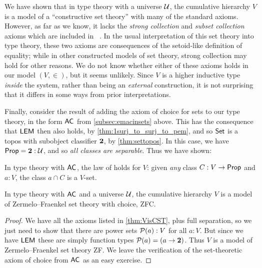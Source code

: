 We have shown that in type theory with a universe $\mathcal{U}$, the cumulative hierarchy $V$ is a model of a ``constructive set theory''
%
with many of the standard axioms.
However, as far as we know, it lacks the \emph{strong collection}
%
%
%
and \emph{subset collection}
%
%
%
axioms which are included in \CZF{}~\cite{AczelCZF}.
In the usual interpretation of this set theory into type theory, these two axioms are consequences of the setoid-like definition of equality; while in other constructed models of set theory, strong collection may hold for other reasons.
We do not know whether either of these axioms holds in our model $(V,\in)$, but it seems unlikely.
Since $V$ is a higher inductive type \emph{inside} the system, rather than being an \emph{external} construction, it is not surprising that it differs in some ways from prior interpretations.

Finally, consider the result of adding the axiom of choice for sets to our type theory, in the form  $\mathsf{AC}_{}$ from \autoref{subsec:emacinsets} above.  This has the consequence that $\mathsf{LEM}_{}$ then also holds, by \autoref{thm:1surj_to_surj_to_pem}, and so $\mathsf{Set}$ is a topos with subobject classifier $\mathbf{2}$, by \autoref{thm:settopos}.  In this case, we have $\mathsf{Prop} = \mathbf{2}:\mathcal{U}$, and so \emph{all classes are separable}.
Thus we have shown:

\begin{lem}\label{lem:fullsep}
  In type theory with $\mathsf{AC}_{}$, the law of 
  holds for $V$: given \emph{any} class $C : V \to \mathsf{Prop}$ and $a : V$, the class $a \cap C$ is a $V$-set.
\end{lem}

\begin{thm}\label{thm:zfc}
In type theory with $\mathsf{AC}_{}$ and a universe $\mathcal{U}$, the cumulative hierarchy $V$ is a model of Zermelo--Fraenkel set theory with choice, ZFC.
\end{thm}

\begin{proof}
We have all the axioms listed in \autoref{thm:VisCST}, plus full separation, so we just need to show that there are power sets $\mathcal{P}(a):V$ for all $a:V$.  But since we have $\mathsf{LEM}_{}$ these are simply function types $\mathcal{P}(a) = (a\to\mathbf{2})$.  Thus $V$ is a model of Zermelo--Fraenkel set theory ZF. We leave the verification of the set-theoretic axiom of choice from $\mathsf{AC}_{}$ as an easy exercise. 
\end{proof}

